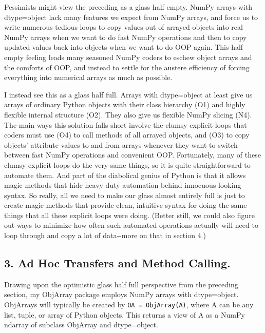 \documentclass[letterpaper,compsoc,twoside]{IEEEtran}
\begin{document}
Pessimists might view the preceding as a \textquotedbl{}glass half empty.\textquotedbl{}  NumPy arrays with dtype=object lack many features we expect from NumPy arrays, and force us to write numerous tedious loops to copy values out of arrayed objects into \textquotedbl{}real\textquotedbl{} NumPy arrays when we want to do fast NumPy operations and then to copy updated values back into objects when we want to do OOP again.  This \textquotedbl{}half empty\textquotedbl{} feeling leads many seasoned NumPy coders to eschew object arrays and the comforts of OOP, and instead to settle for the austere efficiency of forcing everything into numerical arrays as much as possible.

I instead see this as a \textquotedbl{}glass half full.\textquotedbl{}  Arrays with dtype=object at least give us arrays of ordinary Python objects with their class hierarchy (O1) and highly flexible internal structure (O2).  They also give us flexible NumPy slicing (N4).  The main ways this solution falls short involve the clumsy explicit loops that coders must use (O4) to call methods of all arrayed objects, and (O3) to copy objects' attribute values to and from arrays whenever they want to switch between fast NumPy operations and convenient OOP.  Fortunately, many of these clumsy explicit loops do the very same things, so it is quite straightforward to automate them.  And part of the diabolical genius of Python is that it allows \textquotedbl{}magic methods\textquotedbl{} that hide heavy-duty automation behind innocuous-looking syntax.  So really, all we need to make our \textquotedbl{}glass almost entirely full\textquotedbl{} is just to create magic methods that provide clean, intuitive syntax for doing the same things that all these explicit loops were doing.  (Better still, we could also figure out ways to minimize how often such automated operations actually will need to loop through and copy a lot of data-{}-more on that in section 4.)

\subsection{3.  Ad Hoc Transfers and Method Calling.%
  \label{ad-hoc-transfers-and-method-calling}%
}


Drawing upon the optimistic \textquotedbl{}glass half full\textquotedbl{} perspective from the preceding section, my ObjArray package employs NumPy arrays with dtype=object.  ObjArrays will typically be created by \texttt{OA = ObjArray(A)}, where A can be any list, tuple, or array of Python objects.  This returns a view of A as a NumPy ndarray of subclass ObjArray and dtype=object.
\end{document}

